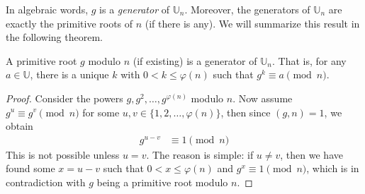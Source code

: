 In algebraic words, $g$ is a \textit{generator} of $\mathbb U_n$. Moreover, the generators of $\mathbb U_n$ are exactly the primitive roots of $n$ (if there is any). We will summarize this result in the following theorem.

\begin{theorem}\label{thm:prequalsU}
	A primitive root $g$ modulo $n$ (if existing) is a generator of $\mathbb U_n$. That is, for any $a\in\mathbb{U}$, there is a unique $k$ with $0< k\leq\varphi(n)$ such that $g^k \equiv a \pmod n$.
\end{theorem}

\begin{proof}
	Consider the powers $g,g^2,\ldots,g^{\varphi (n)}$ modulo $n$. Now assume  $g^u  \equiv g^v \pmod n$ for some $u, v \in \{1,2,\ldots, \varphi(n)\}$, then since $(g,n)=1$, we obtain
		\begin{align*}
			g^{u-v}&\equiv1\pmod n
		\end{align*}
	This is not possible unless $u=v$. The reason is simple: if $u \neq v$, then we have found some $x=u-v$ such that $0 < x \leq \varphi(n)$ and $g^x \equiv 1 \pmod n$, which is in contradiction with $g$ being a primitive root modulo $n$.
\end{proof}

